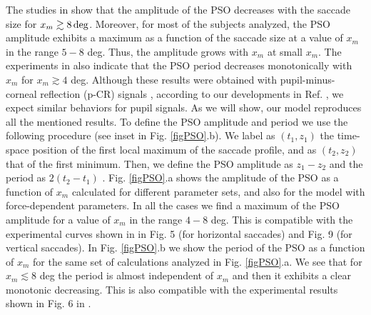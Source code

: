 \documentclass[prl]{revtex4}
\begin{document}
The studies in \cite{holm} show that the amplitude of the PSO decreases with the saccade size for $x_m\gtrsim 8\, {\rm deg}$. Moreover, for most of the subjects analyzed, the PSO amplitude exhibits a maximum as a function of the saccade size at a value of $x_m$ in the range $5-8$ deg. Thus, the amplitude grows with $x_m$ at small $x_m$. The experiments in \cite{holm} also indicate that the PSO period decreases monotonically with $x_m$ for $x_m\gtrsim 4$ deg. Although these results were obtained with pupil-minus-corneal reflection (p-CR) signals \cite{supmat}, according to our developments in Ref. \cite{supmat}, we expect similar behaviors for pupil signals. As we will show, our model reproduces all the mentioned results. To define the PSO amplitude and period we use the following procedure (see inset in Fig. \ref{figPSO}.b). We label as $(t_1,z_1)$ the time-space position of the first local maximum of the saccade profile, and as $(t_2,z_2)$ that of the first minimum. Then, we define the PSO amplitude as $z_1-z_2$ and the period as $2(t_2-t_1)$ \cite{notePSO}. Fig. \ref{figPSO}.a shows the amplitude of the PSO as a function of $x_m$ calculated for different parameter sets, and also for the model with force-dependent parameters. In all the cases we find a maximum of the PSO amplitude for a value of $x_m$ in the range $4-8$ deg. This is compatible with the experimental curves shown in \cite{holm} in Fig. 5 (for horizontal saccades) and Fig. 9 (for vertical saccades). In Fig.  \ref{figPSO}.b we show the period of the PSO as a function of $x_m$ for the same set of calculations analyzed in Fig. \ref{figPSO}.a. We see that for $x_m\lesssim 8$ deg the period is almost independent of $x_m$ and then it exhibits a clear monotonic decreasing. This is also compatible with the experimental results shown in Fig. 6 in \cite{holm}. 
\end{document}
